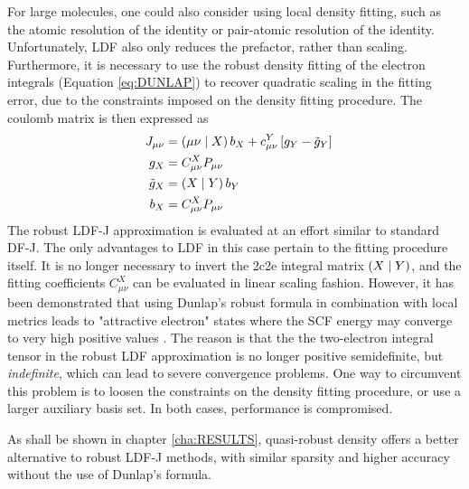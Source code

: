 For large molecules, one could also consider using local density fitting, such as the atomic resolution of the identity or pair-atomic resolution of the identity. Unfortunately, LDF also only reduces the prefactor, rather than scaling. Furthermore, it is necessary to use the robust density fitting of the electron integrals (Equation \ref{eq:DUNLAP}) to recover quadratic scaling in the fitting error, due to the constraints imposed on the density fitting procedure. The coulomb matrix is then expressed as
\begin{align}
J_{\mu\nu} &= \left( \mu\nu \mid X \right) b_X + c^Y_{\mu\nu} \left[ g_Y - \tilde{g}_Y \right] \\
g_X &= C^X_{\mu\nu} P_{\mu\nu} \\
\tilde{g}_X &= \left( X \mid Y \right) b_{Y} \\ 
\quad b_{X} &= C_{\mu\nu}^{X} P_{\mu\nu} 
\end{align}
\noindent The robust LDF-J approximation is evaluated at an effort similar to standard DF-J. The only advantages to LDF in this case pertain to the fitting procedure itself. It is no longer necessary to invert the 2c2e integral matrix $\left( X \mid Y \right)$, and the fitting coefficients $C_{\mu\nu}^{X}$ can be evaluated in linear scaling fashion. However, it has been demonstrated that using Dunlap's robust formula in combination with local metrics leads to "attractive electron" states where the SCF energy may converge to very high positive values \cite{Mer2013,Hol2014}. The reason is that the the two-electron integral tensor in the robust LDF approximation is no longer positive semidefinite, but \emph{indefinite}, which can lead to severe convergence problems. One way to circumvent this problem is to loosen the constraints on the density fitting procedure, or use a larger auxiliary basis set. In both cases, performance is compromised.  

As shall be shown in chapter \ref{cha:RESULTS}, quasi-robust density offers a better alternative to robust LDF-J methods, with similar sparsity and higher accuracy without the use of Dunlap's formula.




